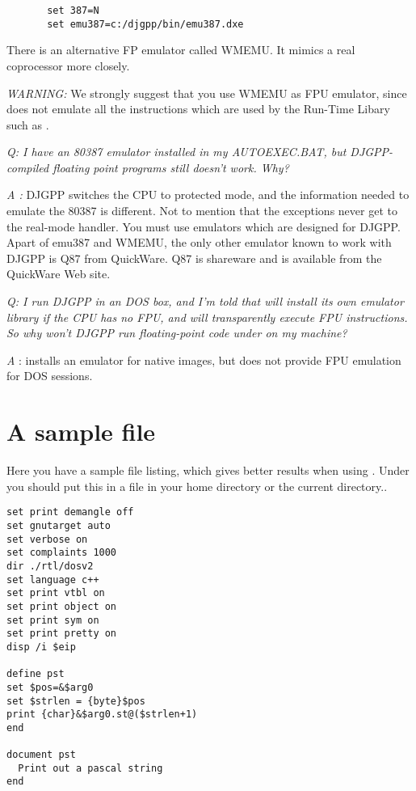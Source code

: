 \begin{verbatim}
       set 387=N
       set emu387=c:/djgpp/bin/emu387.dxe
\end{verbatim}

   There is an alternative FP emulator called WMEMU. It mimics a real
   coprocessor more closely.

   {\em WARNING:} We strongly suggest that you use WMEMU as FPU emulator, since
    does not emulate all the instructions which are used by the
   Run-Time Libary such as .


{\em   Q: I have an 80387 emulator installed in my AUTOEXEC.BAT, but
   DJGPP-compiled floating point programs still doesn't work. Why?
}


{\em   A :} DJGPP switches the CPU to protected mode, and the information
   needed to emulate the 80387 is different. Not to mention that the
   exceptions never get to the real-mode handler. You must use emulators
   which are designed for DJGPP. Apart of emu387 and WMEMU, the only
   other emulator known to work with DJGPP is Q87 from QuickWare. Q87 is
   shareware and is available from the QuickWare Web site.


{\em   Q: I run DJGPP in an \ostwo DOS box, and I'm told that \ostwo will install
   its own emulator library if the CPU has no FPU, and will transparently
   execute FPU instructions. So why won't DJGPP run floating-point code
   under \ostwo on my machine?
}

{\em   A} : \ostwo installs an emulator for native \ostwo images, but does not
   provide FPU emulation for DOS sessions.

\chapter{A sample  file}
\label{ch:GdbIniFile}

Here you have a sample  file listing, which gives better
results when using . Under \linux you should put this in a
 file in your home directory or the current directory..

\begin{verbatim}
set print demangle off
set gnutarget auto
set verbose on
set complaints 1000
dir ./rtl/dosv2
set language c++
set print vtbl on
set print object on
set print sym on
set print pretty on
disp /i $eip

define pst
set $pos=&$arg0
set $strlen = {byte}$pos
print {char}&$arg0.st@($strlen+1)
end

document pst
  Print out a pascal string
end
\end{verbatim}




